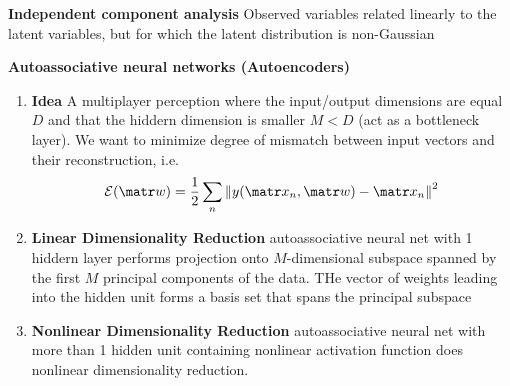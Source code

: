 \documentclass[11pt]{article}
\begin{document}

\begin{defn*}
    \textbf{Independent component analysis} Observed variables related linearly to the latent variables, but for which the latent distribution is non-Gaussian
\end{defn*}

\begin{defn*}
    \textbf{Autoassociative neural networks (Autoencoders)} 
    \begin{enumerate}
        \item \textbf{Idea} A multiplayer perception where the input/output dimensions are equal $D$ and that the hiddern dimension is smaller $M < D$ (act as a bottleneck layer). We want to minimize degree of mismatch between input vectors and their reconstruction, i.e. 
        \[
            \calE (\bw) = \frac{1}{2} \sum_n \norm{y(\bx_n, \bw) - \bx_n}^2
        \]
        \item \textbf{Linear Dimensionality Reduction} autoassociative neural net with 1 hiddern layer performs projection onto $M$-dimensional subspace spanned by the first $M$ principal components of the data. THe vector of weights leading into the hidden unit forms a basis set that spans the principal subspace
        \item \textbf{Nonlinear Dimensionality Reduction} autoassociative neural net with more than 1 hidden unit containing nonlinear activation function does nonlinear dimensionality reduction. 
    \end{enumerate}
\end{defn*}
\end{document}

